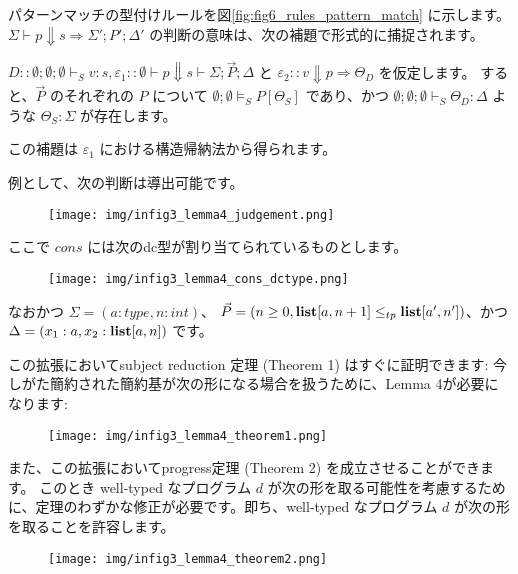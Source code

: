 \documentclass[submit,techreq,noauthor,onecolumn]{ipsj}
\begin{document}
パターンマッチの型付けルールを図\ref{fig:fig6_rules_pattern_match} に示します。
$\Sigma \vdash p \Downarrow s \Rightarrow \Sigma'; P'; \Delta'$ の判断の意味は、次の補題で形式的に捕捉されます。

$D :: \emptyset;\emptyset;\emptyset \vdash_S v:s, \varepsilon_1::\emptyset \vdash p \Downarrow s \vdash \Sigma; \vec{P}; \Delta$ と $\varepsilon_2 :: v \Downarrow p \Rightarrow \Theta_D$ を仮定します。
すると、$\vec{P}$ のそれぞれの $P$ について $\emptyset;\emptyset \models_S P[\Theta_S]$ であり、かつ $\emptyset;\emptyset;\emptyset \vdash_S \Theta_D : \Delta$ ような $\Theta_S : \Sigma$ が存在します。

この補題は $\varepsilon_1$ における構造帰納法から得られます。

\noindent 例として、次の判断は導出可能です。

\begin{figure}[h]
\centering
\texttt{[image: img/infig3\_lemma4\_judgement.png]}
\end{figure}

\noindent ここで \underline{$cons$} には次のdc型が割り当てられているものとします。

\begin{figure}[h]
\centering
\texttt{[image: img/infig3\_lemma4\_cons\_dctype.png]}
\end{figure}

\noindent なおかつ $\Sigma = (a:type, n:int)$、 $\vec{P} = (n \geq 0, {\bf list}[a,n+1] \leq_{tp} {\bf list}[a',n'])$、かつ $\Delta = (x_1:a, x_2:{\bf list}[a,n])$ です。

この拡張においてsubject reduction 定理 (Theorem 1) はすぐに証明できます:
今しがた簡約された簡約基が次の形になる場合を扱うために、Lemma 4が必要になります:

\begin{figure}[h]
\centering
\texttt{[image: img/infig3\_lemma4\_theorem1.png]}
\end{figure}

\noindent また、この拡張においてprogress定理 (Theorem 2) を成立させることができます。
このとき well-typed なプログラム $d$ が次の形を取る可能性を考慮するために、定理のわずかな修正が必要です。即ち、well-typed なプログラム $d$ が次の形を取ることを許容します。

\begin{figure}[h]
\centering
\texttt{[image: img/infig3\_lemma4\_theorem2.png]}
\end{figure}
\end{document}
